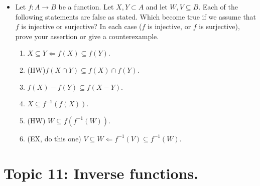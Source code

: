 \documentclass[12pt]{article}
\begin{document}
\begin{itemize}
\item Let $f\colon A \to B$ be a function. Let $X,Y \subset
  A$ and let $W,V \subseteq B$. Each of the following statements are false as stated. Which
  become true if we assume that $f$ is injective or surjective? In
  each case ($f$ is injective, or $f$ is surjective), prove your
  assertion or give a counterexample.
  \begin{enumerate}
  \item $X \subseteq Y \Leftarrow f(X) \subseteq f(Y)$.
  \item (HW)$f(X \cap Y) \subseteq f(X) \cap f(Y)$.
  \item $f(X) - f(Y) \subseteq f(X - Y)$.
  \item $X \subseteq f^{-1}(f(X))$.
  \item (HW) $W \subseteq f(f^{-1}(W))$.
  \item (EX, do this one) $V \subseteq W \Leftarrow f^{-1}(V) \subseteq f^{-1}(W)$.
  \end{enumerate}
  
\end{itemize}




\newpage
\section[11 (\csname dateWeek11\endcsname): Inverse functions.]{Topic  11: Inverse functions.}
\end{document}
